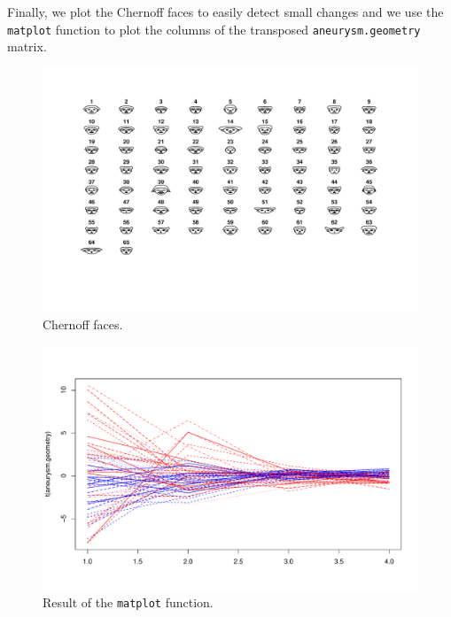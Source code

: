 \documentclass[a4paper]{article}
\begin{document}
    \noindent
    Finally, we plot the Chernoff faces to easily detect small changes and we use the \texttt{matplot} function to plot the columns of the transposed \texttt{aneurysm.geometry} matrix.
    
    \begin{figure}[!htp]
        \centering
        \includegraphics[width=\textwidth]{img/visualization-of-multivariate-data-13.pdf}
        \caption*{Chernoff faces.}
    \end{figure}

    \begin{figure}[!htp]
        \centering
        \includegraphics[width=\textwidth]{img/visualization-of-multivariate-data-14.pdf}
        \caption*{Result of the \texttt{matplot} function.}
    \end{figure}

    \newpage
\end{document}
